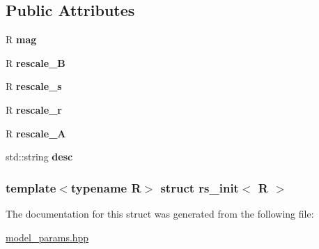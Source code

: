 \subsection*{Public Attributes}
\begin{DoxyCompactItemize}
\item 
\hypertarget{structrs__init_a8fa698ef5e1f5151d0393c836d84f780}{
R {\bfseries mag}}
\label{structrs__init_a8fa698ef5e1f5151d0393c836d84f780}

\item 
\hypertarget{structrs__init_a0a8127cb70006a9d1a41d4ebf17b9cb2}{
R {\bfseries rescale\_\-B}}
\label{structrs__init_a0a8127cb70006a9d1a41d4ebf17b9cb2}

\item 
\hypertarget{structrs__init_a32db36edb844b37147b363e8d53b68b5}{
R {\bfseries rescale\_\-s}}
\label{structrs__init_a32db36edb844b37147b363e8d53b68b5}

\item 
\hypertarget{structrs__init_a33b5a3f878b4f7b9284a7537895a82b8}{
R {\bfseries rescale\_\-r}}
\label{structrs__init_a33b5a3f878b4f7b9284a7537895a82b8}

\item 
\hypertarget{structrs__init_aa6fbf7fda7d4907c3e6af6153a2ef4d1}{
R {\bfseries rescale\_\-A}}
\label{structrs__init_aa6fbf7fda7d4907c3e6af6153a2ef4d1}

\item 
\hypertarget{structrs__init_a649b9690f64e93b8c5098a5d53235b70}{
std::string {\bfseries desc}}
\label{structrs__init_a649b9690f64e93b8c5098a5d53235b70}

\end{DoxyCompactItemize}
\subsubsection*{template$<$typename R$>$ struct rs\_\-init$<$ R $>$}



The documentation for this struct was generated from the following file:\begin{DoxyCompactItemize}
\item 
\hyperlink{model__params_8hpp}{model\_\-params.hpp}\end{DoxyCompactItemize}
